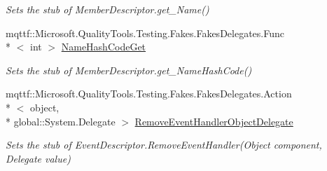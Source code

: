 \begin{DoxyCompactItemize}
\begin{DoxyCompactList}\small\item\em Sets the stub of Member\-Descriptor.\-get\-\_\-\-Name()\end{DoxyCompactList}\item 
mqttf\-::\-Microsoft.\-Quality\-Tools.\-Testing.\-Fakes.\-Fakes\-Delegates.\-Func\\*
$<$ int $>$ \hyperlink{class_system_1_1_component_model_1_1_fakes_1_1_stub_event_descriptor_aaac779619c40d79f29ec38c189e3f51f}{Name\-Hash\-Code\-Get}
\begin{DoxyCompactList}\small\item\em Sets the stub of Member\-Descriptor.\-get\-\_\-\-Name\-Hash\-Code()\end{DoxyCompactList}\item 
mqttf\-::\-Microsoft.\-Quality\-Tools.\-Testing.\-Fakes.\-Fakes\-Delegates.\-Action\\*
$<$ object, \\*
global\-::\-System.\-Delegate $>$ \hyperlink{class_system_1_1_component_model_1_1_fakes_1_1_stub_event_descriptor_a996d1b5ba062ca120496f05ca86ca40d}{Remove\-Event\-Handler\-Object\-Delegate}
\begin{DoxyCompactList}\small\item\em Sets the stub of Event\-Descriptor.\-Remove\-Event\-Handler(\-Object component, Delegate value)\end{DoxyCompactList}\end{DoxyCompactItemize}
